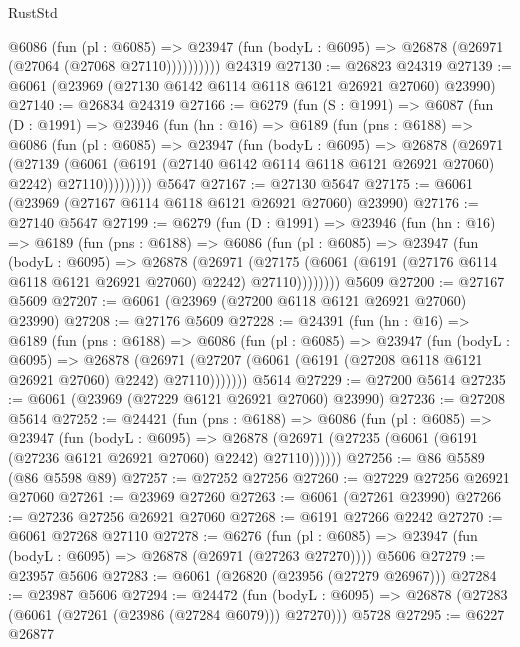 \begin{lexlean}{RustStd}
\begin{coremodule}
{\begin{coremodule}
{{{{{{{{{{{{{{{{{{{{{{{{{{            @6086
              (fun (pl : @6085) =>
              @23947 (fun (bodyL : @6095) => @26878 (@26971 (@27064 (@27068 @27110))))))))))
    @24319
@27130 := @26823 @24319
@27139 := @6061 (@23969 (@27130 @6142 @6114 @6118 @6121 @26921 @27060) @23990)
@27140 := @26834 @24319
@27166 := @6279
    (fun (S : @1991) =>
    @6087
      (fun (D : @1991) =>
      @23946
        (fun (hn : @16) =>
        @6189
          (fun (pns : @6188) =>
          @6086
            (fun (pl : @6085) =>
            @23947
              (fun (bodyL : @6095) =>
              @26878
                (@26971
                  (@27139
                    (@6061
                      (@6191 (@27140 @6142 @6114 @6118 @6121 @26921 @27060) @2242)
                      @27110)))))))))
    @5647
@27167 := @27130 @5647
@27175 := @6061 (@23969 (@27167 @6114 @6118 @6121 @26921 @27060) @23990)
@27176 := @27140 @5647
@27199 := @6279
    (fun (D : @1991) =>
    @23946
      (fun (hn : @16) =>
      @6189
        (fun (pns : @6188) =>
        @6086
          (fun (pl : @6085) =>
          @23947
            (fun (bodyL : @6095) =>
            @26878
              (@26971
                (@27175 (@6061 (@6191 (@27176 @6114 @6118 @6121 @26921 @27060) @2242) @27110))))))))
    @5609
@27200 := @27167 @5609
@27207 := @6061 (@23969 (@27200 @6118 @6121 @26921 @27060) @23990)
@27208 := @27176 @5609
@27228 := @24391
    (fun (hn : @16) =>
    @6189
      (fun (pns : @6188) =>
      @6086
        (fun (pl : @6085) =>
        @23947
          (fun (bodyL : @6095) =>
          @26878
            (@26971 (@27207 (@6061 (@6191 (@27208 @6118 @6121 @26921 @27060) @2242) @27110)))))))
    @5614
@27229 := @27200 @5614
@27235 := @6061 (@23969 (@27229 @6121 @26921 @27060) @23990)
@27236 := @27208 @5614
@27252 := @24421
    (fun (pns : @6188) =>
    @6086
      (fun (pl : @6085) =>
      @23947
        (fun (bodyL : @6095) =>
        @26878 (@26971 (@27235 (@6061 (@6191 (@27236 @6121 @26921 @27060) @2242) @27110))))))
@27256 := @86 @5589 (@86 @5598 @89)
@27257 := @27252 @27256
@27260 := @27229 @27256 @26921 @27060
@27261 := @23969 @27260
@27263 := @6061 (@27261 @23990)
@27266 := @27236 @27256 @26921 @27060
@27268 := @6191 @27266 @2242
@27270 := @6061 @27268 @27110
@27278 := @6276
    (fun (pl : @6085) => @23947 (fun (bodyL : @6095) => @26878 (@26971 (@27263 @27270))))
    @5606
@27279 := @23957 @5606
@27283 := @6061 (@26820 (@23956 (@27279 @26967)))
@27284 := @23987 @5606
@27294 := @24472
    (fun (bodyL : @6095) => @26878 (@27283 (@6061 (@27261 (@23986 (@27284 @6079))) @27270)))
    @5728
@27295 := @6227 @26877
}}}}}}}}}}}}}}}}}}}}}}}}}}
\end{coremodule}}
\end{coremodule}
\end{lexlean}
